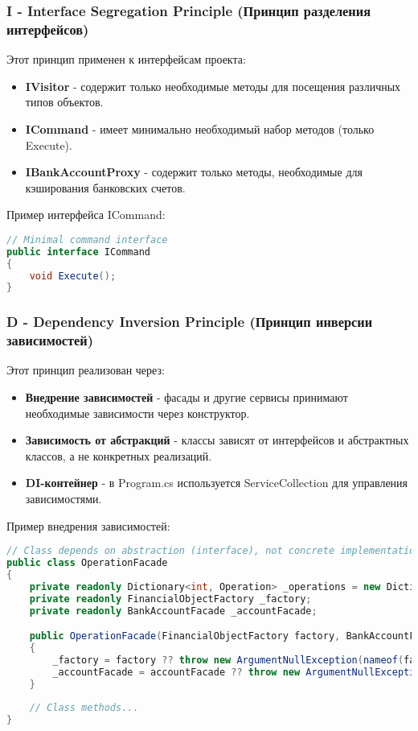 \documentclass[12pt,a4paper]{article}
\begin{document}
\subsubsection{I - Interface Segregation Principle (Принцип разделения интерфейсов)}

Этот принцип применен к интерфейсам проекта:

\begin{itemize}
    \item \textbf{IVisitor} - содержит только необходимые методы для посещения различных типов объектов.
    \item \textbf{ICommand} - имеет минимально необходимый набор методов (только Execute).
    \item \textbf{IBankAccountProxy} - содержит только методы, необходимые для кэширования банковских счетов.
\end{itemize}

Пример интерфейса ICommand:

\begin{lstlisting}[language=csharp]
// Minimal command interface
public interface ICommand
{
    void Execute();
}
\end{lstlisting}

\subsubsection{D - Dependency Inversion Principle (Принцип инверсии зависимостей)}

Этот принцип реализован через:

\begin{itemize}
    \item \textbf{Внедрение зависимостей} - фасады и другие сервисы принимают необходимые зависимости через конструктор.
    \item \textbf{Зависимость от абстракций} - классы зависят от интерфейсов и абстрактных классов, а не конкретных реализаций.
    \item \textbf{DI-контейнер} - в Program.cs используется ServiceCollection для управления зависимостями.
\end{itemize}

Пример внедрения зависимостей:

\begin{lstlisting}[language=csharp]
// Class depends on abstraction (interface), not concrete implementation
public class OperationFacade
{
    private readonly Dictionary<int, Operation> _operations = new Dictionary<int, Operation>();
    private readonly FinancialObjectFactory _factory;
    private readonly BankAccountFacade _accountFacade;

    public OperationFacade(FinancialObjectFactory factory, BankAccountFacade accountFacade)
    {
        _factory = factory ?? throw new ArgumentNullException(nameof(factory));
        _accountFacade = accountFacade ?? throw new ArgumentNullException(nameof(accountFacade));
    }
    
    // Class methods...
}
\end{lstlisting}
\end{document}
